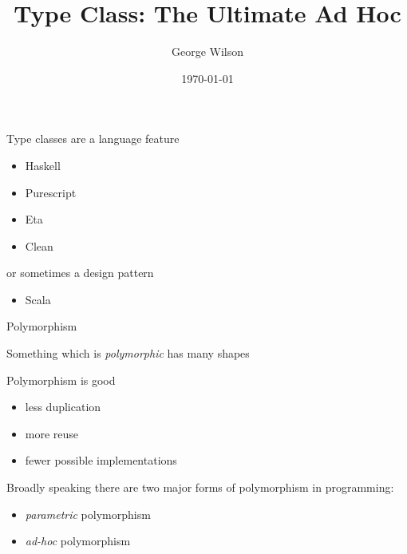 \documentclass[usenames,dvipsnames,svgnames,table,aspectratio=169,mathserif]{beamer}
\title[Type Class: The Ultimate Ad Hoc]{Type Class: The Ultimate Ad Hoc} %
\author{George Wilson} %
\institute[] %
{
Data61/CSIRO\\ %
\medskip
\href{george.wilson@data61.csiro.au}{george.wilson@data61.csiro.au} %
}
\date{\today} %
\begin{document}


\begin{frame}
\titlepage %
\end{frame}


\begin{frame}

Type classes are a language feature

\begin{itemize}
\item Haskell
\item Purescript
\item Eta
\item Clean
\end{itemize}

or sometimes a design pattern

\begin{itemize}
\item Scala
\end{itemize}

\end{frame}



\begin{frame}
\begin{center}
\huge{Polymorphism}
\end{center}
\end{frame}


\begin{frame}

Something which is {\it polymorphic} has many shapes

\end{frame}


\begin{frame}
\begin{center}
Polymorphism is good


\begin{itemize}
\item less duplication
\item more reuse
\item fewer possible implementations
\end{itemize}
\end{center}
\end{frame}


\begin{frame}
Broadly speaking there are two major forms of polymorphism in programming:

\begin{itemize}
\item {\it parametric} polymorphism
\item {\it ad-hoc} polymorphism
\end{itemize}
\end{frame}
\end{document}
